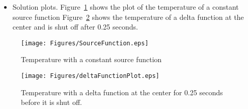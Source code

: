 \begin{itemize}
	\item Solution plots.  Figure~\ref{fig:Figures_SourceFunction} shows the plot of the temperature of a constant source function  Figure~\ref{fig:Figures_deltaFunctionPlot} shows the temperature of a delta function at the center and is shut off after 0.25 seconds.
\end{itemize}
\begin{figure}[htbp]
	\centering
		\texttt{[image: Figures/SourceFunction.eps]}
	\caption{Temperature with a constant source function}
	\label{fig:Figures_SourceFunction}
\end{figure}
\begin{figure}[htbp]
	\centering
		\texttt{[image: Figures/deltaFunctionPlot.eps]}
	\caption{Temperature with a delta function at the center for 0.25 seconds before it is shut off.}
	\label{fig:Figures_deltaFunctionPlot}
\end{figure}
		
